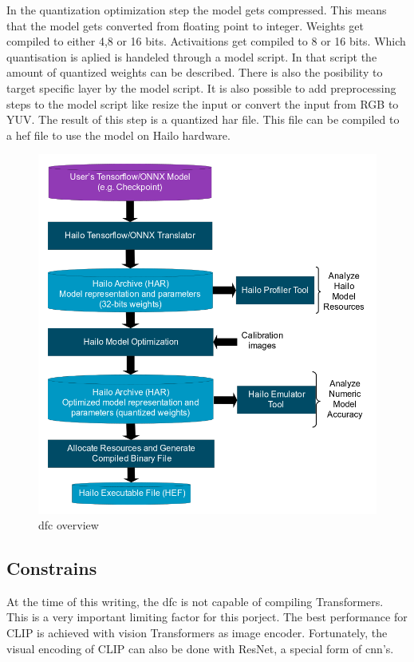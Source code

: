 In the quantization optimization step the model gets compressed.
This means that the model gets converted from floating point to integer.
Weights get compiled to either 4,8 or 16 bits.
Activaitions get compiled to 8 or 16 bits.
Which quantisation is aplied is handeled through a model script.
In that script the amount of quantized weights can be described.
There is also the posibility to target specific layer by the model script.
It is also possible to add preprocessing steps to the model script like resize the input or convert the input from RGB to YUV.
The result of this step is a quantized \acrshort{har} file.
This file can be compiled to a \acrshort{hef} file to use the model on Hailo hardware.

\begin{figure}
    \centering
    \includegraphics[width=\textwidth]{Images/Hardware/model_build_overview_with_onnx_and_hef_w_har.png}
    \caption{\Acrlong{dfc} overview \cite{hailo_dataflow_compiler}}
    \label{fig:hardware:dfcoverview}
\end{figure}

\subsection{Constrains}
At the time of this writing, the \acrshort{dfc} is not capable of compiling Transformers.
This is a very important limiting factor for this porject.
The best performance for CLIP is achieved with vision Transformers as image encoder.
Fortunately, the visual encoding of CLIP can also be done with ResNet, a special form of \Acrshort{cnn}'s.

